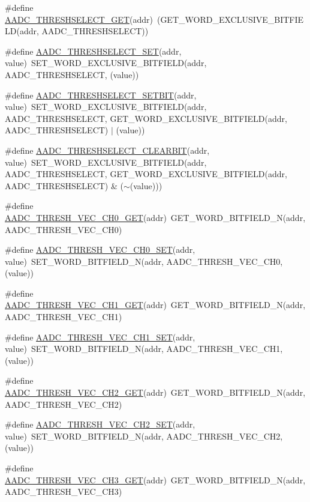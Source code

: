 \begin{DoxyCompactItemize}
\item 
\#define \hyperlink{a00542_a30c961f6c42d36fa745e34d2201d1f89}{AADC\_\-THRESHSELECT\_\-GET}(addr)~(GET\_\-WORD\_\-EXCLUSIVE\_\-BITFIELD(addr, AADC\_\-THRESHSELECT))
\item 
\#define \hyperlink{a00542_a8f9d40471a76188ddce8aefb032d3e5d}{AADC\_\-THRESHSELECT\_\-SET}(addr, value)~SET\_\-WORD\_\-EXCLUSIVE\_\-BITFIELD(addr, AADC\_\-THRESHSELECT, (value))
\item 
\#define \hyperlink{a00542_a5cf5a1f3a91e6b0e581dc3386b321c37}{AADC\_\-THRESHSELECT\_\-SETBIT}(addr, value)~SET\_\-WORD\_\-EXCLUSIVE\_\-BITFIELD(addr, AADC\_\-THRESHSELECT, GET\_\-WORD\_\-EXCLUSIVE\_\-BITFIELD(addr, AADC\_\-THRESHSELECT) $|$ (value))
\item 
\#define \hyperlink{a00542_a20714f2a7e93293051adc1f3ca52fc99}{AADC\_\-THRESHSELECT\_\-CLEARBIT}(addr, value)~SET\_\-WORD\_\-EXCLUSIVE\_\-BITFIELD(addr, AADC\_\-THRESHSELECT, GET\_\-WORD\_\-EXCLUSIVE\_\-BITFIELD(addr, AADC\_\-THRESHSELECT) \& ($\sim$(value)))
\item 
\#define \hyperlink{a00542_ab57ba1f2f9878b137d34587b58eed7ae}{AADC\_\-THRESH\_\-VEC\_\-CH0\_\-GET}(addr)~GET\_\-WORD\_\-BITFIELD\_\-N(addr, AADC\_\-THRESH\_\-VEC\_\-CH0)
\item 
\#define \hyperlink{a00542_ad08e4df6d975193d03e9a950239363b8}{AADC\_\-THRESH\_\-VEC\_\-CH0\_\-SET}(addr, value)~SET\_\-WORD\_\-BITFIELD\_\-N(addr, AADC\_\-THRESH\_\-VEC\_\-CH0, (value))
\item 
\#define \hyperlink{a00542_a72c53085f9217cfc099fde8656a199c0}{AADC\_\-THRESH\_\-VEC\_\-CH1\_\-GET}(addr)~GET\_\-WORD\_\-BITFIELD\_\-N(addr, AADC\_\-THRESH\_\-VEC\_\-CH1)
\item 
\#define \hyperlink{a00542_ac28708459dacd33eb0d897ef363f503e}{AADC\_\-THRESH\_\-VEC\_\-CH1\_\-SET}(addr, value)~SET\_\-WORD\_\-BITFIELD\_\-N(addr, AADC\_\-THRESH\_\-VEC\_\-CH1, (value))
\item 
\#define \hyperlink{a00542_a570a671d12f045f8e6aa1e2d7108972f}{AADC\_\-THRESH\_\-VEC\_\-CH2\_\-GET}(addr)~GET\_\-WORD\_\-BITFIELD\_\-N(addr, AADC\_\-THRESH\_\-VEC\_\-CH2)
\item 
\#define \hyperlink{a00542_afd40848326fb00e90b105cfa297cfc92}{AADC\_\-THRESH\_\-VEC\_\-CH2\_\-SET}(addr, value)~SET\_\-WORD\_\-BITFIELD\_\-N(addr, AADC\_\-THRESH\_\-VEC\_\-CH2, (value))
\item 
\#define \hyperlink{a00542_a06f85147efc12fe45724d7aee3207e28}{AADC\_\-THRESH\_\-VEC\_\-CH3\_\-GET}(addr)~GET\_\-WORD\_\-BITFIELD\_\-N(addr, AADC\_\-THRESH\_\-VEC\_\-CH3)

\end{DoxyCompactItemize}
